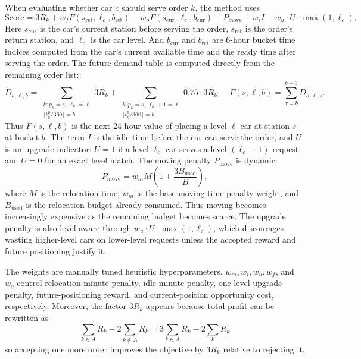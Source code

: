 \documentclass[10pt,a4paper]{article}
\begin{document}
When evaluating whether car $c$ should serve order $k$, the method uses
\[
\text{Score}
=3R_k
+ w_f F(s_{\text{ret}}, \ell_c, b_{\text{ret}})
- w_o F(s_{\text{cur}}, \ell_c, b_{\text{cur}})
- P_{\text{move}}
- w_i I
- w_u \cdot U \cdot \max(1,\ell_c).
\]
Here $s_{\text{cur}}$ is the car's current station before serving the order,
$s_{\text{ret}}$ is the order's return station, and $\ell_c$ is the car level.
And $b_{\text{cur}}$ and $b_{\text{ret}}$ are 6-hour bucket
time indices computed from the car's current available time and the ready time after
serving the order.  The future-demand table is computed
directly from the remaining order list:
\[
D_{s,\ell,b}=\sum_{\substack{k:p_k=s,\ \ell_k=\ell\\
\lfloor t^p_k/360\rfloor=b}}3R_k
+\sum_{\substack{k:p_k=s,\ \ell_k+1=\ell\\
\lfloor t^p_k/360\rfloor=b}}0.75\cdot 3R_k,
\quad
F(s,\ell,b)=\sum_{\tau=b}^{b+3}D_{s,\ell,\tau}.
\]
Thus $F(s,\ell,b)$ is the next-24-hour value of placing a level-$\ell$ car at
station $s$ at bucket $b$.  The term $I$ is the idle time before the car can
serve the order, and $U$ is an upgrade indicator: $U=1$ if a level-$\ell_c$ car
serves a level-$(\ell_c-1)$ request, and $U=0$ for an exact level match.
The moving penalty $P_{\text{move}}$ is dynamic:
\[
P_{\text{move}}=w_m M\left(1+\frac{3B_{\text{used}}}{B}\right),
\]
where $M$ is the relocation time, $w_m$ is the base moving-time penalty weight,
and $B_{\text{used}}$ is the relocation budget already consumed.  Thus moving
becomes increasingly expensive as the remaining budget becomes scarce.  The
upgrade penalty is also level-aware through
$w_u\cdot U\cdot\max(1,\ell_c)$, which discourages wasting higher-level cars on
lower-level requests unless the accepted reward and future positioning justify
it.

The weights are manually tuned heuristic hyperparameters.  $w_m,w_i,w_u,w_f$,
and $w_o$ control relocation-minute penalty, idle-minute penalty, one-level
upgrade penalty, future-positioning reward, and current-position opportunity
cost, respectively.
Moreover, the factor $3R_k$ appears because total profit can be rewritten as
\[\sum_{k\in A} R_k-2\sum_{k\notin A}R_k = 3\sum_{k\in A}R_k-2\sum_k R_k\]
so accepting one more order improves the objective by $3R_k$ relative to
rejecting it.
\end{document}
